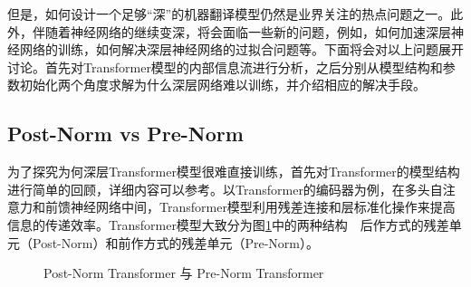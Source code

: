 \parinterval 但是，如何设计一个足够“深”的机器翻译模型仍然是业界关注的热点问题之一。此外，伴随着神经网络的继续变深，将会面临一些新的问题，例如，如何加速深层神经网络的训练，如何解决深层神经网络的过拟合问题等。下面将会对以上问题展开讨论。首先对Transformer模型的内部信息流进行分析，之后分别从模型结构和参数初始化两个角度求解为什么深层网络难以训练，并介绍相应的解决手段。


\subsection{Post-Norm vs Pre-Norm}
\label{sec:post-pre-norm}

\parinterval 为了探究为何深层Transformer模型很难直接训练，首先对Transformer的模型结构进行简单的回顾，详细内容可以参考{\chaptertwelve}。以Transformer的编码器为例，在多头自注意力和前馈神经网络中间，Transformer模型利用残差连接和层标准化操作来提高信息的传递效率。Transformer模型大致分为图\ref{fig:15-9}中的两种结构\ \dash \ 后作方式的残差单元（Post-Norm）和前作方式的残差单元（Pre-Norm）。

\begin{figure}[htp]
\centering

\caption{Post-Norm Transformer 与 Pre-Norm Transformer}
\label{fig:15-9}
\end{figure}


